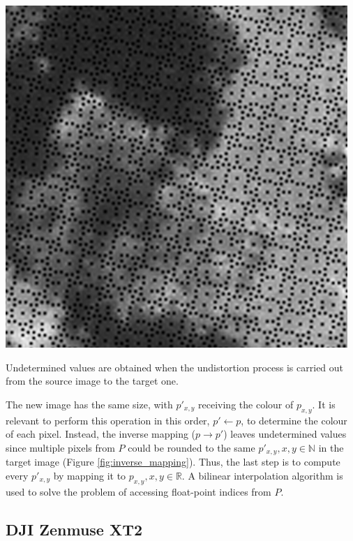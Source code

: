 \begin{marginfigure}[-2cm]
	\includegraphics{figs/materials/inverse_mapping.png}
	\caption{Undetermined values are obtained when the undistortion process is carried out from the source image to the target one.}
	\label{fig:inverse_mapping}
\end{marginfigure}
The new image has the same size, with $p'_{x,y}$ receiving the colour of $p_{x,y}$. It is relevant to perform this operation in this order, $p' \gets p$, to determine the colour of each pixel. Instead, the inverse mapping ($p \rightarrow p'$) leaves undetermined values since multiple pixels from $P$ could be rounded to the same $p'_{x, y}, x, y \in \mathbb{N}$ in the target image (Figure \ref{fig:inverse_mapping}). Thus, the last step is to compute every $p'_{x,y}$ by mapping it to $p_{x, y}, x, y \in \mathbb{R}$. A bilinear interpolation algorithm is used to solve the problem of accessing float-point indices from $P$.

\subsection{DJI Zenmuse XT2}

